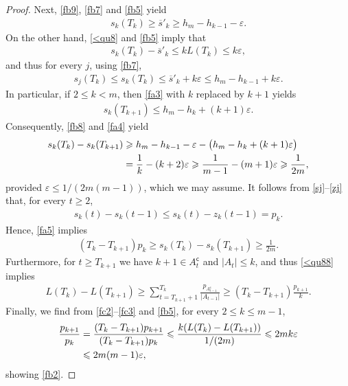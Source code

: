 \documentclass[11pt,reqno,tbtags,a4paper]{amsart}
\numberwithin{equation}{section}
\renewcommand\le{\leq}
\renewcommand\ge{\geq}
\renewcommand\leq{\leqslant}
\renewcommand\geq{\geqslant}
\theoremstyle{plain}%
\theoremstyle{definition}
\theoremstyle{remark}
\newcommand\bigpar[1]{\bigl(#1\bigr)}
\newcommand\eps{\varepsilon}
\newcommand\cp{^{\mathsf c}}
\newcommand\bsk{\overline{s}'_k}
\newcommand\0{{\boldsymbol 0}}
\newcommand\1{{\boldsymbol 1}}
\begin{document}
\begin{proof}
Next, \eqref{fb9}, \eqref{fb7} and \eqref{fb5} yield
\begin{align}\label{fb8}
s_k(T_k)
\ge \bsk
\ge h_m-h_{k-1}-\eps
.\end{align}
On the other hand, \eqref{<qu8} and \eqref{fb5} imply that
\begin{align}\label{fa2}
s_k(T_k)- \bsk
\le k L(T_k) \le k\eps,
\end{align}
and thus for every $j$, using \eqref{fb7},
\begin{align}\label{fa3}
  s_j(T_k)\le s_k(T_k) 
\le \bsk + k\eps
\le h_m-h_{k-1} + k\eps
.\end{align}
In particular, if $2\le k<m$, then \eqref{fa3} with $k$ replaced by $k+1$ yields
\begin{align}\label{fa4}
  s_k(T_{k+1})\le h_m-h_k+(k+1)\eps.
\end{align}
%
%
Consequently, %
\eqref{fb8} and \eqref{fa4} yield
\begin{align}\label{fa5}
  s_k(T_k)-s_k(T_{k+1}) &\ge h_m-h_{k-1}-\eps - \bigpar{h_m-h_k+(k+1)\eps}
\notag\\&
= \frac{1}k-(k+2)\eps
\ge \frac{1}{m-1}-(m+1)\eps
\ge \frac{1}{2m},
\end{align}
provided $\eps\le 1/(2m(m-1))$, which we may assume.
It follows from \eqref{sj}--\eqref{zj} that, for every $t\ge2$, 
\begin{align}\label{fc1}
s_k(t)-s_{k}(t-1)\le s_k(t)-z_k(t-1)=p_k.  
\end{align}
Hence, \eqref{fa5} implies
\begin{align}\label{fc2}
  (T_k-T_{k+1})p_k \ge s_k(T_k)-s_k(T_{k+1})\ge \frac{1}{2m}.
\end{align}
Furthermore, 
for $t\ge T_{k+1}$
we have $k+1\in A\cp_{t}$ and $|A_t|\le k$,
and thus \eqref{<qu88}
implies
\begin{align}\label{fc3}
  L(T_k)-L(T_{k+1})
\ge \sum_{t=T_{k+1}+1}^{T_k}  \frac{p_{A\cp_{t-1}}}{|A_{t-1}|}
\ge(T_k-T_{k+1})\frac{p_{k+1}}k
.\end{align}
Finally, we find from \eqref{fc2}--\eqref{fc3} and \eqref{fb5}, for every
$2\le k\le m-1$,
\begin{align}
  \frac{p_{k+1}}{p_k}&
=  \frac{(T_k-T_{k+1})p_{k+1}}{(T_k-T_{k+1})p_k}
\le \frac{k(L(T_k)-L(T_{k+1}))}{1/(2m)}\le 2mk\eps
\notag\\&
\le 2m(m-1)\eps,
\end{align}
showing \eqref{fb2}. %
\end{proof}
\end{document}
